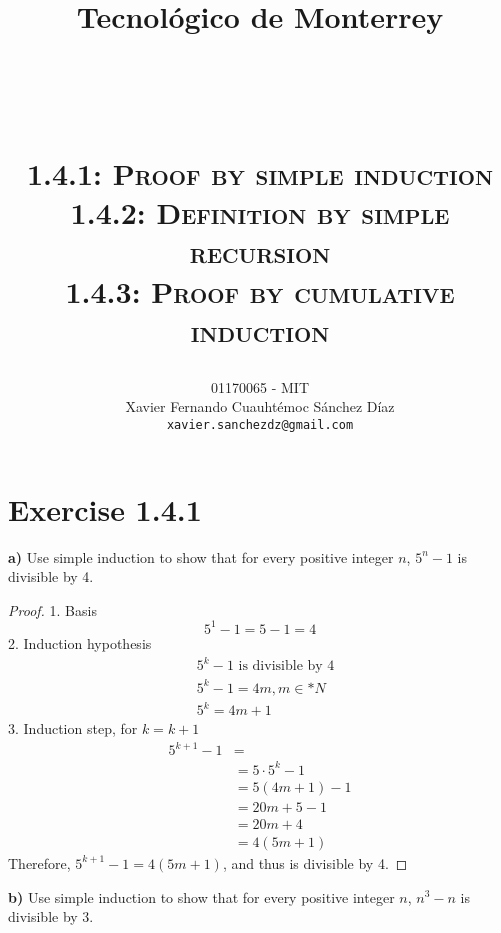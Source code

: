 \documentclass[titlepage, letterpaper, fleqn]{article}
\title{
\vspace{1in}
\textbf{Tecnológico de Monterrey} \\
\vspace{0.5in}
\textmd{\mahclass} \\
\large{\textit{\mahteacher}} \\
\vspace{0.5in}
\textsc{\mahtitle}\\
\textsc{1.4.1: Proof by simple induction}\\
\textsc{1.4.2: Definition by simple recursion}\\
\textsc{1.4.3: Proof by cumulative induction}\\
\author{01170065  - MIT \\
Xavier Fernando Cuauhtémoc Sánchez Díaz \\
\texttt{xavier.sanchezdz@gmail.com}}
\date{\mahdate}
}
\newcommand{\spacepls}{\vspace{5mm}}
\begin{document}
\begin{titlepage}
\maketitle
\end{titlepage}

%
%

\section{Exercise 1.4.1}

{\large \textbf{a)} Use simple induction to show that for every positive integer \(n\), \(5^n - 1\) is divisible by 4.}

\begin{proof}
1. Basis \\
\[5 ^1 - 1 = 5 - 1 = 4 \tag*{n = 1}\]
2. Induction hypothesis \\
\begin{align*}
& 5^k - 1 \text{ is divisible by 4} \tag*{n=k}\\
& 5^k - 1 = 4m, m \in \mathbb*{N}\\
& 5^k = 4m + 1 \tag*{arithmetic}
\end{align*}
3. Induction step, for \(k = k+1\) \\
\begin{align*}
5^{k+1} - 1 & = \\
& = 5 \cdot 5^k - 1 \\
& = 5(4m + 1) - 1 \tag*{substitution with hypothesis}\\
& = 20m + 5 - 1\\
& = 20m + 4\\
& = 4(5m+1)
\end{align*}
Therefore, \(5^{k+1}-1 = 4(5m+1)\), and thus is divisible by 4.
\end{proof}

\spacepls

{\large \textbf{b)} Use simple induction to show that for every positive integer \(n\), \(n^3 - n\) is divisible by 3.}
\end{document}
